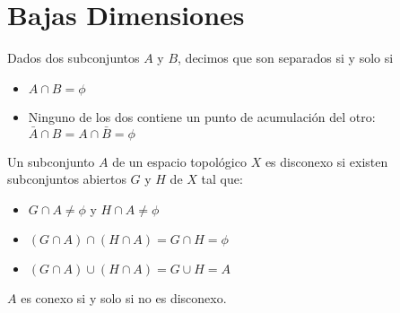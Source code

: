 \documentclass{./Topologia.tex}
\begin{document}
\chapter{Bajas Dimensiones}
Dados dos subconjuntos $A$ y $B$, decimos que son separados si y solo si
\begin{itemize}
	\item $A \cap B= \phi$
	\item Ninguno de los dos contiene un punto de acumulación del otro: $\bar{A}\cap B = A \cap \bar{B} = \phi$ 
\end{itemize}
\begin{defin}
Un subconjunto $A$ de un espacio topológico $X$ es disconexo si existen subconjuntos abiertos $G$ y $H$ de $X$ tal que:
\begin{itemize}
	\item $G \cap A \neq \phi$ y $H \cap A \neq \phi$
	\item $(G \cap A) \cap (H \cap A) = G \cap H = \phi$
	\item $(G \cap A) \cup (H \cap A) = G \cup H = A$ 
\end{itemize}
$A$ es conexo si y solo si no es disconexo. 
\end{defin}
\end{document}
